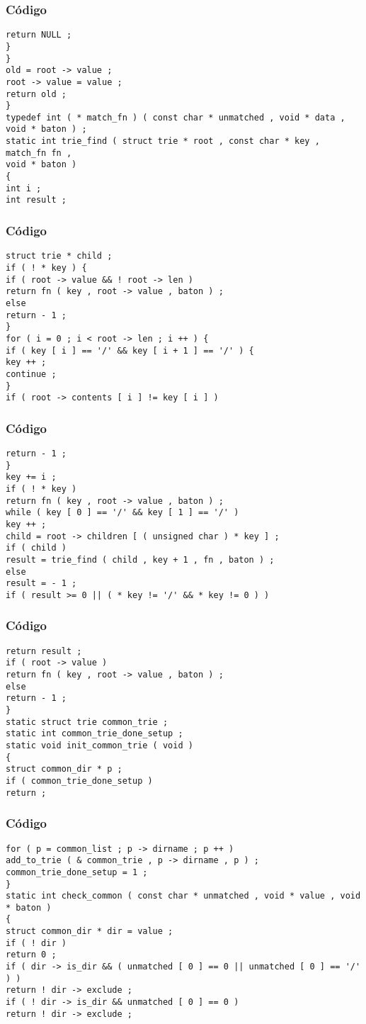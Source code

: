 \documentclass{beamer}
\begin{document}
\begin{frame}[fragile]
\frametitle{C\'odigo}
\begin{verbatim}
return NULL ; 
} 
} 
old = root -> value ; 
root -> value = value ; 
return old ; 
} 
typedef int ( * match_fn ) ( const char * unmatched , void * data , void * baton ) ; 
static int trie_find ( struct trie * root , const char * key , match_fn fn , 
void * baton ) 
{ 
int i ; 
int result ; 
\end{verbatim}
\end{frame}
\begin{frame}[fragile]
\frametitle{C\'odigo}
\begin{verbatim}
struct trie * child ; 
if ( ! * key ) { 
if ( root -> value && ! root -> len ) 
return fn ( key , root -> value , baton ) ; 
else 
return - 1 ; 
} 
for ( i = 0 ; i < root -> len ; i ++ ) { 
if ( key [ i ] == '/' && key [ i + 1 ] == '/' ) { 
key ++ ; 
continue ; 
} 
if ( root -> contents [ i ] != key [ i ] ) 
\end{verbatim}
\end{frame}
\begin{frame}[fragile]
\frametitle{C\'odigo}
\begin{verbatim}
return - 1 ; 
} 
key += i ; 
if ( ! * key ) 
return fn ( key , root -> value , baton ) ; 
while ( key [ 0 ] == '/' && key [ 1 ] == '/' ) 
key ++ ; 
child = root -> children [ ( unsigned char ) * key ] ; 
if ( child ) 
result = trie_find ( child , key + 1 , fn , baton ) ; 
else 
result = - 1 ; 
if ( result >= 0 || ( * key != '/' && * key != 0 ) ) 
\end{verbatim}
\end{frame}
\begin{frame}[fragile]
\frametitle{C\'odigo}
\begin{verbatim}
return result ; 
if ( root -> value ) 
return fn ( key , root -> value , baton ) ; 
else 
return - 1 ; 
} 
static struct trie common_trie ; 
static int common_trie_done_setup ; 
static void init_common_trie ( void ) 
{ 
struct common_dir * p ; 
if ( common_trie_done_setup ) 
return ; 
\end{verbatim}
\end{frame}
\begin{frame}[fragile]
\frametitle{C\'odigo}
\begin{verbatim}
for ( p = common_list ; p -> dirname ; p ++ ) 
add_to_trie ( & common_trie , p -> dirname , p ) ; 
common_trie_done_setup = 1 ; 
} 
static int check_common ( const char * unmatched , void * value , void * baton ) 
{ 
struct common_dir * dir = value ; 
if ( ! dir ) 
return 0 ; 
if ( dir -> is_dir && ( unmatched [ 0 ] == 0 || unmatched [ 0 ] == '/' ) ) 
return ! dir -> exclude ; 
if ( ! dir -> is_dir && unmatched [ 0 ] == 0 ) 
return ! dir -> exclude ; 
\end{verbatim}
\end{frame}
\end{document}
